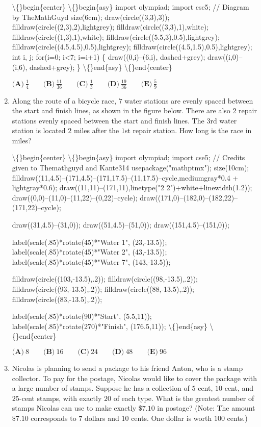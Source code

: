 \documentclass{article}
\begin{document}
\begin{enumerate}[label=\arabic*., itemsep=0.5em]
\textbackslash\{\}begin\{center\}
\textbackslash\{\}begin\{asy\}
import olympiad;
import cse5;
// Diagram by TheMathGuyd
size(6cm);
draw(circle((3,3),3));
filldraw(circle((2,3),2),lightgrey);
filldraw(circle((3,3),1),white);
filldraw(circle((1,3),1),white);
filldraw(circle((5.5,3),0.5),lightgrey);
filldraw(circle((4.5,4.5),0.5),lightgrey);
filldraw(circle((4.5,1.5),0.5),lightgrey);
int i, j;
for(i=0; i<7; i=i+1)
\{
draw((0,i)--(6,i), dashed+grey);
draw((i,0)--(i,6), dashed+grey);
\}
\textbackslash\{\}end\{asy\}
\textbackslash\{\}end\{center\}


\(\textbf{(A)}\ \frac{1}{4} \qquad \textbf{(B)}\ \frac{11}{36} \qquad \textbf{(C)}\ \frac{1}{3} \qquad \textbf{(D)}\ \frac{19}{36} \qquad \textbf{(E)}\ \frac{5}{9}\)\par \vspace{0.5em}\item Along the route of a bicycle race, \(7\) water stations are evenly spaced between the start and finish lines,
as shown in the figure below. There are also \(2\) repair stations evenly spaced between the start and
finish lines. The \(3\)rd water station is located \(2\) miles after the \(1\)st repair station. How long is the race
in miles?

\textbackslash\{\}begin\{center\}
\textbackslash\{\}begin\{asy\}
import olympiad;
import cse5;
// Credits given to Themathguyd and Kante314
usepackage("mathptmx");
size(10cm);
filldraw((11,4.5)--(171,4.5)--(171,17.5)--(11,17.5)--cycle,mediumgray*0.4 + lightgray*0.6);
draw((11,11)--(171,11),linetype("2 2")+white+linewidth(1.2));
draw((0,0)--(11,0)--(11,22)--(0,22)--cycle);
draw((171,0)--(182,0)--(182,22)--(171,22)--cycle);

draw((31,4.5)--(31,0));
draw((51,4.5)--(51,0));
draw((151,4.5)--(151,0));

label(scale(.85)*rotate(45)*"Water 1", (23,-13.5));
label(scale(.85)*rotate(45)*"Water 2", (43,-13.5));
label(scale(.85)*rotate(45)*"Water 7", (143,-13.5));

filldraw(circle((103,-13.5),.2));
filldraw(circle((98,-13.5),.2));
filldraw(circle((93,-13.5),.2));
filldraw(circle((88,-13.5),.2));
filldraw(circle((83,-13.5),.2));

label(scale(.85)*rotate(90)*"Start", (5.5,11));
label(scale(.85)*rotate(270)*"Finish", (176.5,11));
\textbackslash\{\}end\{asy\}
\textbackslash\{\}end\{center\}

\(\textbf{(A)}\ 8 \qquad \textbf{(B)}\ 16 \qquad \textbf{(C)}\ 24 \qquad \textbf{(D)}\ 48 \qquad \textbf{(E)}\ 96\)\par \vspace{0.5em}\item Nicolas is planning to send a package to his friend Anton, who is a stamp collector. To pay for the postage, Nicolas would like to cover the package with a large number of stamps. Suppose he has a collection of \(5\)-cent, \(10\)-cent, and \(25\)-cent stamps, with exactly \(20\) of each type. What is the greatest number of stamps Nicolas can use to make exactly \(\$7.10\) in postage?
(Note: The amount \(\$7.10\) corresponds to \(7\) dollars and \(10\) cents. One dollar is worth \(100\) cents.)


\end{enumerate}
\end{document}
